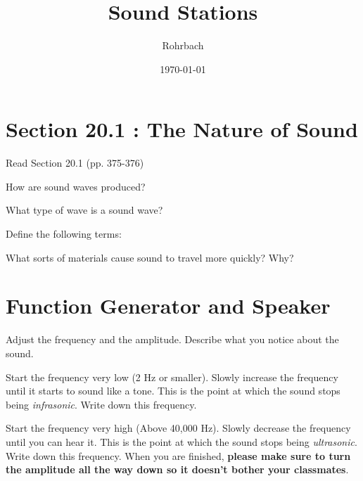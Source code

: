 \documentclass[10pt]{exam}
\title{Sound Stations}
\author{Rohrbach}
\date{\today}
\begin{document}
\maketitle

\section{Section 20.1 : The Nature of Sound}

Read Section 20.1 (pp. 375-376)

\begin{questions}
  \question 
    How are sound waves produced?

  \question 
    What type of wave is a sound wave?

  \question 
    Define the following terms:


  \question 
    What sorts of materials cause sound to travel more quickly?  Why?

\end{questions}

\section{Function Generator and Speaker}

\begin{questions}
  \question
    Adjust the frequency and the amplitude.  Describe what you notice about the sound.

  \question
    Start the frequency very low (2 Hz or smaller).  Slowly increase the frequency until it starts to sound like a tone.  This is the point at which the sound stops being \emph{infrasonic}.  Write down this frequency.


  \question
    Start the frequency very high (Above 40,000 Hz).  Slowly decrease the frequency until you can hear it.  This is the point at which the sound stops being \emph{ultrasonic}.  Write down this frequency.  When you are finished, {\bf please make sure to turn the amplitude all the way down so it doesn't bother your classmates}.

\end{questions}
\end{document}
